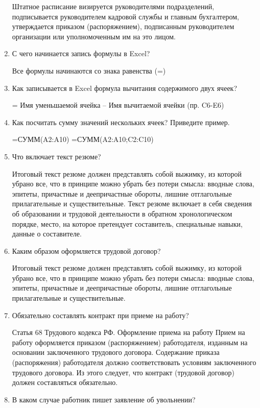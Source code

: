 \documentclass[a4paper,10pt]{article}
\theoremstyle{plain} %
\theoremstyle{definition} %
\theoremstyle{remark} %
\begin{document}
\begin{enumerate}
	Штатное расписание визируется руководителями подразделений, подписывается руководителем кадровой службы и главным бухгалтером, утверждается приказом (распоряжением), подписанным руководителем организации или уполномоченным им на это лицом.

	\item С чего начинается запись формулы в Excel?
	
	Все формулы начинаются со знака равенства (=)

	\item Как записывается в Excel формула вычитания содержимого двух ячеек?
	
	= Имя уменьшаемой ячейка – Имя вычитаемой ячейки (пр. C6-E6)

	\item Как посчитать сумму значений нескольких ячеек? Приведите пример.
	
	 =СУММ(A2:A10)
	=СУММ(A2:A10;C2:C10)
	

	\item Что включает текст резюме?
	
	Итоговый текст резюме должен представлять собой выжимку, из которой убрано все, что в принципе можно убрать без потери смысла: вводные слова, эпитеты, причастные и деепричастные обороты, лишние отглагольные прилагательные и существительные. Текст резюме включает в себя сведения об образовании и трудовой деятельности в обратном хронологическом порядке, место, на которое претендует составитель, специальные навыки, данные о составителе. 

	\item Каким образом оформляется трудовой договор?
	
	Итоговый текст резюме должен представлять собой выжимку, из которой убрано все, что в принципе можно убрать без потери смысла: вводные слова, эпитеты, причастные и деепричастные обороты, лишние отглагольные прилагательные и существительные.

	\item Обязательно составлять контракт при приеме на работу?
	
	Статья 68 Трудового кодекса РФ. Оформление приема на работу Прием на работу оформляется приказом (распоряжением) работодателя, изданным на основании заключенного трудового договора. Содержание приказа (распоряжения) работодателя должно соответствовать условиям заключенного трудового договора. Из этого следует, что контракт (трудовой договор) должен составляться обязательно.

	\item В каком случае работник пишет заявление об увольнении?
	

\end{enumerate}
\end{document}
